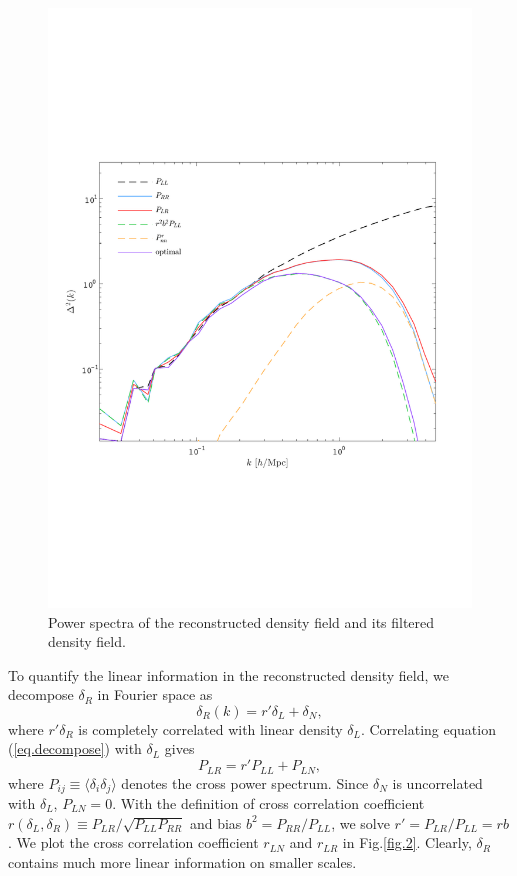 \documentclass[aps,prd,twocolumn,superscriptaddress,amsfont,amssymb,amsmath,nofootinbib,showpacs,balancelastpage]{revtex4-1}
\begin{document}
\begin{figure}[t] \centering
  \includegraphics[width=1.0\linewidth]{fig4.pdf}
  \caption{Power spectra of the reconstructed density field and its
  filtered density field.}
  \label{fig.4}
\end{figure}

To quantify the linear information in the reconstructed density field, we decompose $\delta_R$ in Fourier space as
\begin{equation}\label{eq.decompose}
    \delta_R(k)=r'\delta_L+\delta_N,
\end{equation}
where $r'\delta_R$ is completely correlated with linear density $\delta_L$. Correlating equation (\ref{eq.decompose}) with $\delta_L$ gives
\begin{equation}
    P_{LR}=r'P_{LL}+P_{LN},
\end{equation}
where $P_{ij}\equiv\langle\delta_i\delta_j\rangle$ denotes the cross power 
spectrum. Since $\delta_N$ is uncorrelated with $\delta_L$, $P_{LN}=0$. With the 
definition of cross correlation coefficient $r(\delta_L,\delta_R)\equiv P_{LR}/\sqrt{P_{LL}P_{RR}}$ 
and bias $b^2=P_{RR}/P_{LL}$, we solve $r'=P_{LR}/P_{LL}=rb$. We plot the cross 
correlation coefficient $r_{LN}$ and $r_{LR}$ in Fig.\ref{fig.2}. Clearly, $
\delta_R$ contains much more linear information on smaller scales.
\end{document}
